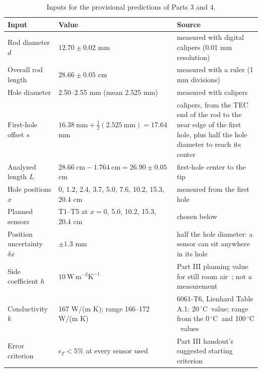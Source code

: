 \documentclass[reprint, amsmath, amssymb, aps, prl]{revtex4-2}
\newcommand{\degC}{\ensuremath{\,^\circ\mathrm{C}}}
\newcommand{\WmmK}{\mathrm{W\,m^{-2}K^{-1}}}
\begin{document}
\begin{table}[t]
\caption{\label{tab:inputs}Inputs for the provisional predictions of Parts 3 and 4.}
\begin{ruledtabular}
\begin{tabular}{lp{}p{}}
Input & Value & Source \\
\hline
Rod diameter $d$ & $12.70\pm0.02$ mm & measured with digital calipers (0.01 mm resolution) \\
Overall rod length & $28.66\pm0.05$ cm & measured with a ruler (1 mm divisions) \\
Hole diameter & 2.50--2.55 mm (mean 2.525 mm) & measured with calipers \\
First-hole offset $s$ & $16.38~\mathrm{mm}+\tfrac12(2.525~\mathrm{mm})=17.64$ mm & calipers, from the TEC end of the rod to the near edge of the first hole, plus half the hole diameter to reach its center \\
Analyzed length $L$ & $28.66~\mathrm{cm}-1.764~\mathrm{cm}=26.90\pm0.05$ cm & first-hole center to the tip \\
Hole positions $x$ & 0, 1.2, 2.4, 3.7, 5.0, 7.6, 10.2, 15.3, 20.4 cm & measured from the first hole \\
Planned sensors & T1--T5 at $x=0$, 5.0, 10.2, 15.3, 20.4 cm & chosen below \\
Position uncertainty $\delta x$ & $\pm1.3$ mm & half the hole diameter: a sensor can sit anywhere in its hole \\
Side coefficient $h$ & $10~\WmmK$ & Part III planning value for still room air~\cite{handout}; not a measurement \\
Conductivity $k$ & 167 W/(m K); range 166--172 W/(m K) & 6061-T6, Lienhard Table A.1: 20\degC\ value; range from the 0\degC\ and 100\degC\ values \\
Error criterion & $\epsilon_T<5\%$ at every sensor used & Part III handout's suggested starting criterion \\
\end{tabular}
\end{ruledtabular}
\end{table}
\end{document}
